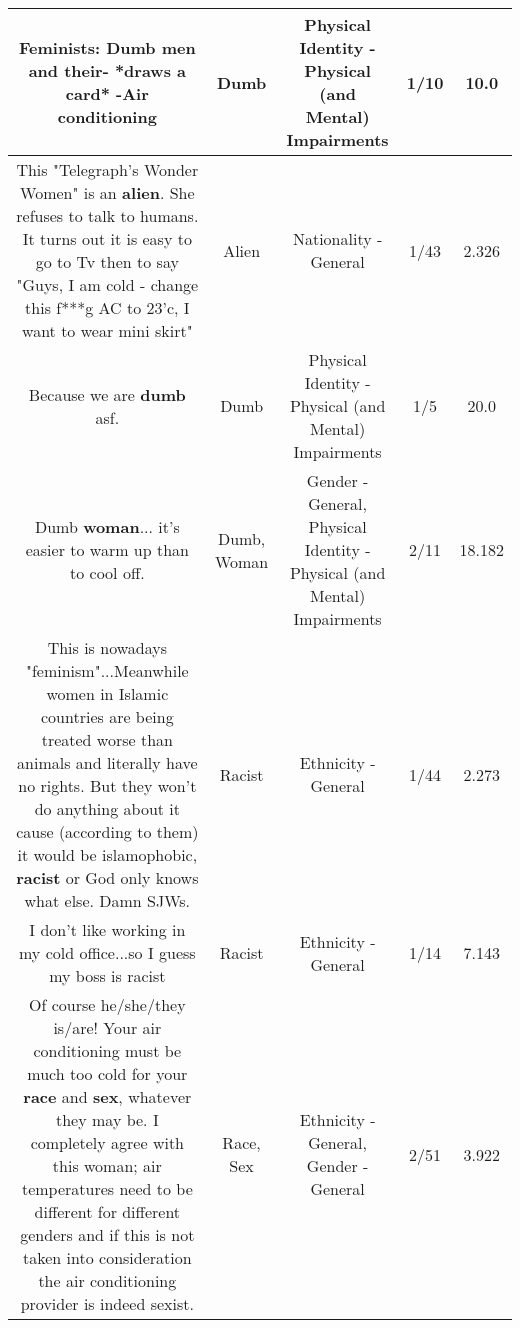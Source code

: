 \documentclass[11pt]{article}
\newlength\mylength
\begin{document}
\begin{center}
\begin{longtable}{|C{.65\mylength}|C{.30\mylength}|C{.12\mylength}|C{.12\mylength}|C{.12\mylength}|}
  \small Feminists: \textbf{Dumb} men and their- *draws a card* -Air conditioning\normalsize   & Dumb & Physical Identity - Physical (and Mental) Impairments & 1/10 & 10.0 \\  \hline
  \small This "Telegraph's Wonder Women" is an \textbf{alien}. She refuses to talk to humans. It turns out it is easy to go to Tv then to say "Guys, I am cold - change this f***g AC to 23'c, I want to wear mini skirt"\normalsize   & Alien & Nationality - General & 1/43 & 2.326 \\  \hline
  \small Because we are \textbf{dumb} asf.\normalsize   & Dumb & Physical Identity - Physical (and Mental) Impairments & 1/5 & 20.0 \\  \hline
  \small Dumb \textbf{woman}... it's easier to warm up than to cool off.\normalsize   & Dumb, Woman & Gender - General, Physical Identity - Physical (and Mental) Impairments & 2/11 & 18.182 \\  \hline
  \small This is nowadays "feminism"...Meanwhile women in Islamic countries are being treated worse than animals and literally have no rights. But they won't do anything about it cause (according to them) it would be islamophobic, \textbf{racist} or God only knows what else. Damn SJWs.\normalsize   & Racist & Ethnicity - General & 1/44 & 2.273 \\  \hline
  \small I don't like working in my cold office...so I guess my boss is racist\normalsize   & Racist & Ethnicity - General & 1/14 & 7.143 \\  \hline
  \small Of course he/she/they is/are! Your air conditioning must be much too cold for your \textbf{race} and \textbf{sex}, whatever they may be. I completely agree with this woman;  air temperatures need to be different for different genders and if this is not taken into consideration the air conditioning provider is indeed sexist.\normalsize   & Race, Sex & Ethnicity - General, Gender - General & 2/51 & 3.922 \\  \hline

\end{longtable}
\end{center}
\end{document}
